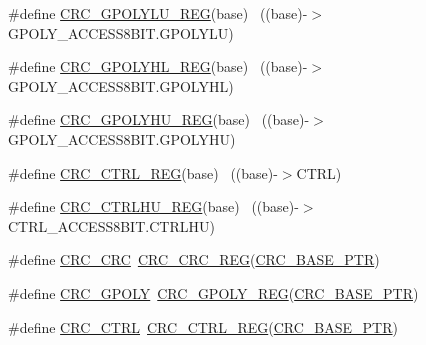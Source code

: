 \begin{DoxyCompactItemize}
\item 
\#define \hyperlink{group___c_r_c___register___accessor___macros_ga1ad8ace74d9ab86940dfd4d066635b1c}{C\+R\+C\+\_\+\+G\+P\+O\+L\+Y\+L\+U\+\_\+\+R\+EG}(base)                                    ~((base)-\/$>$G\+P\+O\+L\+Y\+\_\+\+A\+C\+C\+E\+S\+S8\+B\+I\+T.\+G\+P\+O\+L\+Y\+LU)
\item 
\#define \hyperlink{group___c_r_c___register___accessor___macros_gac5b8db04ab62b0ea728987e54a9aab93}{C\+R\+C\+\_\+\+G\+P\+O\+L\+Y\+H\+L\+\_\+\+R\+EG}(base)                                    ~((base)-\/$>$G\+P\+O\+L\+Y\+\_\+\+A\+C\+C\+E\+S\+S8\+B\+I\+T.\+G\+P\+O\+L\+Y\+HL)
\item 
\#define \hyperlink{group___c_r_c___register___accessor___macros_ga1692656f77c7ec2de5c561f84e5811b2}{C\+R\+C\+\_\+\+G\+P\+O\+L\+Y\+H\+U\+\_\+\+R\+EG}(base)                                    ~((base)-\/$>$G\+P\+O\+L\+Y\+\_\+\+A\+C\+C\+E\+S\+S8\+B\+I\+T.\+G\+P\+O\+L\+Y\+HU)
\item 
\#define \hyperlink{group___c_r_c___register___accessor___macros_gaf046fbac123e09bad1bf8238974247c5}{C\+R\+C\+\_\+\+C\+T\+R\+L\+\_\+\+R\+EG}(base)                                          ~((base)-\/$>$C\+T\+RL)
\item 
\#define \hyperlink{group___c_r_c___register___accessor___macros_ga680ec9b0b037687ce6b43e13d72599a5}{C\+R\+C\+\_\+\+C\+T\+R\+L\+H\+U\+\_\+\+R\+EG}(base)                                      ~((base)-\/$>$C\+T\+R\+L\+\_\+\+A\+C\+C\+E\+S\+S8\+B\+I\+T.\+C\+T\+R\+L\+HU)
\item 
\#define \hyperlink{group___c_r_c___register___accessor___macros_ga99e479e85b3b249fd5c296fa60993b19}{C\+R\+C\+\_\+\+C\+RC}~\hyperlink{group___c_r_c___register___accessor___macros_ga8c19463133fc11b80ce6beaa0559b049}{C\+R\+C\+\_\+\+C\+R\+C\+\_\+\+R\+EG}(\hyperlink{group___c_r_c___peripheral_ga139bd4056b9e3c7987d28b6e955b662d}{C\+R\+C\+\_\+\+B\+A\+S\+E\+\_\+\+P\+TR})
\item 
\#define \hyperlink{group___c_r_c___register___accessor___macros_ga6fa4fa4a9a7cb5649a494120c89beb72}{C\+R\+C\+\_\+\+G\+P\+O\+LY}~\hyperlink{group___c_r_c___register___accessor___macros_ga4380a8ebc7eff991b5db31a826e12c34}{C\+R\+C\+\_\+\+G\+P\+O\+L\+Y\+\_\+\+R\+EG}(\hyperlink{group___c_r_c___peripheral_ga139bd4056b9e3c7987d28b6e955b662d}{C\+R\+C\+\_\+\+B\+A\+S\+E\+\_\+\+P\+TR})
\item 
\#define \hyperlink{group___c_r_c___register___accessor___macros_gae7431cd932210c6ef38ebcd07672aa8b}{C\+R\+C\+\_\+\+C\+T\+RL}~\hyperlink{group___c_r_c___register___accessor___macros_gaf046fbac123e09bad1bf8238974247c5}{C\+R\+C\+\_\+\+C\+T\+R\+L\+\_\+\+R\+EG}(\hyperlink{group___c_r_c___peripheral_ga139bd4056b9e3c7987d28b6e955b662d}{C\+R\+C\+\_\+\+B\+A\+S\+E\+\_\+\+P\+TR})

\end{DoxyCompactItemize}

